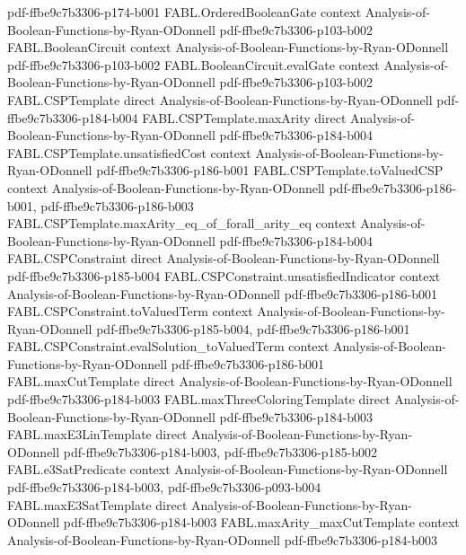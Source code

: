 \begin{theorem}
  {pdf-ffbe9c7b3306-p174-b001}
\proofstep
  {FABL.OrderedBooleanGate}
  {context}
  {Analysis-of-Boolean-Functions-by-Ryan-ODonnell}
  {pdf-ffbe9c7b3306-p103-b002}
\proofstep
  {FABL.BooleanCircuit}
  {context}
  {Analysis-of-Boolean-Functions-by-Ryan-ODonnell}
  {pdf-ffbe9c7b3306-p103-b002}
\proofstep
  {FABL.BooleanCircuit.evalGate}
  {context}
  {Analysis-of-Boolean-Functions-by-Ryan-ODonnell}
  {pdf-ffbe9c7b3306-p103-b002}
\proofstep
  {FABL.CSPTemplate}
  {direct}
  {Analysis-of-Boolean-Functions-by-Ryan-ODonnell}
  {pdf-ffbe9c7b3306-p184-b004}
\proofstep
  {FABL.CSPTemplate.maxArity}
  {direct}
  {Analysis-of-Boolean-Functions-by-Ryan-ODonnell}
  {pdf-ffbe9c7b3306-p184-b004}
\proofstep
  {FABL.CSPTemplate.unsatisfiedCost}
  {context}
  {Analysis-of-Boolean-Functions-by-Ryan-ODonnell}
  {pdf-ffbe9c7b3306-p186-b001}
\proofstep
  {FABL.CSPTemplate.toValuedCSP}
  {context}
  {Analysis-of-Boolean-Functions-by-Ryan-ODonnell}
  {pdf-ffbe9c7b3306-p186-b001,
    pdf-ffbe9c7b3306-p186-b003}
\proofstep
  {FABL.CSPTemplate.maxArity_eq_of_forall_arity_eq}
  {context}
  {Analysis-of-Boolean-Functions-by-Ryan-ODonnell}
  {pdf-ffbe9c7b3306-p184-b004}
\proofstep
  {FABL.CSPConstraint}
  {direct}
  {Analysis-of-Boolean-Functions-by-Ryan-ODonnell}
  {pdf-ffbe9c7b3306-p185-b004}
\proofstep
  {FABL.CSPConstraint.unsatisfiedIndicator}
  {context}
  {Analysis-of-Boolean-Functions-by-Ryan-ODonnell}
  {pdf-ffbe9c7b3306-p186-b001}
\proofstep
  {FABL.CSPConstraint.toValuedTerm}
  {context}
  {Analysis-of-Boolean-Functions-by-Ryan-ODonnell}
  {pdf-ffbe9c7b3306-p185-b004,
    pdf-ffbe9c7b3306-p186-b001}
\proofstep
  {FABL.CSPConstraint.evalSolution_toValuedTerm}
  {context}
  {Analysis-of-Boolean-Functions-by-Ryan-ODonnell}
  {pdf-ffbe9c7b3306-p186-b001}
\proofstep
  {FABL.maxCutTemplate}
  {direct}
  {Analysis-of-Boolean-Functions-by-Ryan-ODonnell}
  {pdf-ffbe9c7b3306-p184-b003}
\proofstep
  {FABL.maxThreeColoringTemplate}
  {direct}
  {Analysis-of-Boolean-Functions-by-Ryan-ODonnell}
  {pdf-ffbe9c7b3306-p184-b003}
\proofstep
  {FABL.maxE3LinTemplate}
  {direct}
  {Analysis-of-Boolean-Functions-by-Ryan-ODonnell}
  {pdf-ffbe9c7b3306-p184-b003,
    pdf-ffbe9c7b3306-p185-b002}
\proofstep
  {FABL.e3SatPredicate}
  {context}
  {Analysis-of-Boolean-Functions-by-Ryan-ODonnell}
  {pdf-ffbe9c7b3306-p184-b003,
    pdf-ffbe9c7b3306-p093-b004}
\proofstep
  {FABL.maxE3SatTemplate}
  {direct}
  {Analysis-of-Boolean-Functions-by-Ryan-ODonnell}
  {pdf-ffbe9c7b3306-p184-b003}
\proofstep
  {FABL.maxArity_maxCutTemplate}
  {context}
  {Analysis-of-Boolean-Functions-by-Ryan-ODonnell}
  {pdf-ffbe9c7b3306-p184-b003}

\end{theorem}
